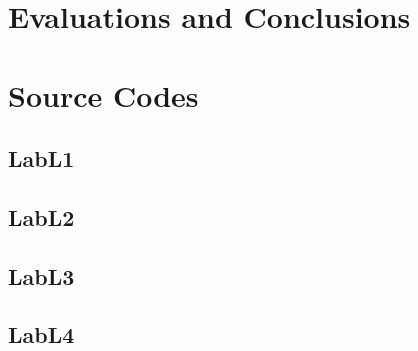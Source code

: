 \documentclass{article}
\begin{document}

\section{Evaluations and Conclusions}



\section{Source Codes}


\subsection{LabL1}



\subsection{LabL2}



\subsection{LabL3}



\subsection{LabL4}



\end{document}
